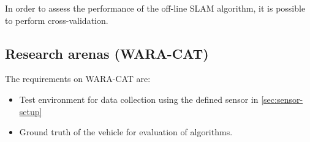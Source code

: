In order to assess the performance of the off-line \gls{SLAM}
algorithm, it is possible to perform cross-validation.

\subsection{Research arenas (WARA-CAT)}


The requirements on WARA-CAT are:
\begin{itemize}
  \item Test environment for data collection using the defined sensor in
    \ref{sec:sensor-setup}
\item Ground truth of the vehicle for evaluation of algorithms.
\end{itemize}


